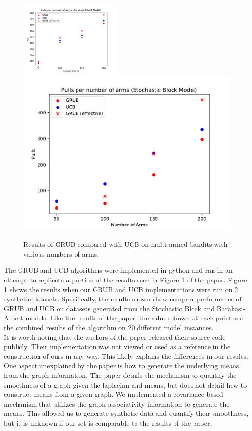 \documentclass{article}[12pt]
\begin{document}
\begin{figure}[h]
    \centering
    \includegraphics[width=0.45\textwidth]{../ba_figure.pdf}
    \hfill
    \includegraphics[width=0.45\linewidth]{../sbm_figure.pdf}
	  \caption{Results of GRUB compared with UCB on multi-armed bandits with various numbers of arms.}
    \label{fig:results}
\end{figure}

The GRUB and UCB algorithms were implemented in python and ran in an attempt to replicate a portion of the results seen in Figure 1 of the paper.
Figure \ref{fig:results} shows the results when our GRUB and UCB implementations were run on 2 synthetic datasets.
Specifically, the results shown show compare performance of GRUB and UCB on datasets generated from the Stochastic Block and Barabasi-Albert models.
Like the results of the paper, the values shown at each point are the combined results of the algorithm on 20 different model instances. \\

It is worth noting that the authors of the paper released their source code publicly.
Their implementation was not viewed or used as a reference in the construction of ours in any way.
This likely explains the differences in our results. \\

One aspect unexplained by the paper is how to generate the underlying means from the graph information.
The paper details the mechanism to quantify the smoothness of a graph given the laplacian and means,
but does not detail how to construct means from a given graph.
We implemented a covariance-based mechanism that utilizes the graph associativity information to generate the means.
This allowed us to generate synthetic data and quantify their smoothness,
but it is unknown if our set is comparable to the results of the paper. \\
\end{document}

